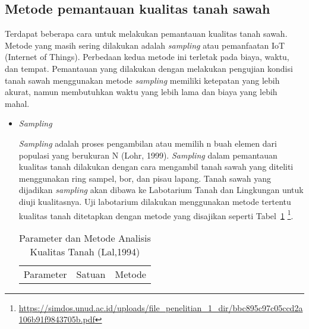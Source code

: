 \subsection{Metode pemantauan kualitas tanah sawah}
Terdapat beberapa cara untuk melakukan pemantauan kualitas tanah sawah. Metode yang masih sering dilakukan adalah \textit{sampling} atau pemanfaatan IoT (Internet of Things). Perbedaan kedua metode ini terletak pada biaya, waktu, dan tempat. Pemantauan yang dilakukan dengan melakukan pengujian kondisi tanah sawah menggunakan metode \textit{sampling} memiliki ketepatan yang lebih akurat, namun membutuhkan waktu yang lebih lama dan biaya yang lebih mahal. 
\begin{itemize}
    \item \textit{Sampling}
    
    \textit{Sampling} adalah proses pengambilan atau memilih n buah elemen dari populasi yang berukuran N (Lohr, 1999). \textit{Sampling} dalam pemantauan kualitas tanah dilakukan dengan cara mengambil tanah sawah yang diteliti menggunakan ring sampel, bor, dan pisau lapang. Tanah sawah yang dijadikan \textit{sampling} akan dibawa ke Labotarium Tanah dan Lingkungan untuk diuji kualitasnya. Uji labotarium dilakukan menggunakan metode tertentu kualitas tanah ditetapkan dengan metode yang disajikan seperti Tabel~\ref{tab:Parameter dan Metode Analisis Kualitas Tanah} \footnote{\url{https://simdos.unud.ac.id/uploads/file_penelitian_1_dir/bbc895c97c05ccd2a106b91f9843705b.pdf}}.
    
    \begin{table}[H] 
	\centering 
	\caption{Parameter dan Metode Analisis Kualitas Tanah (Lal,1994)}
	\label{tab:Parameter dan Metode Analisis Kualitas Tanah}
	\begin{tabular}{ccc}
		\toprule
		 Parameter & Satuan & Metode \\


\end{tabular}
\end{table}
\end{itemize}
